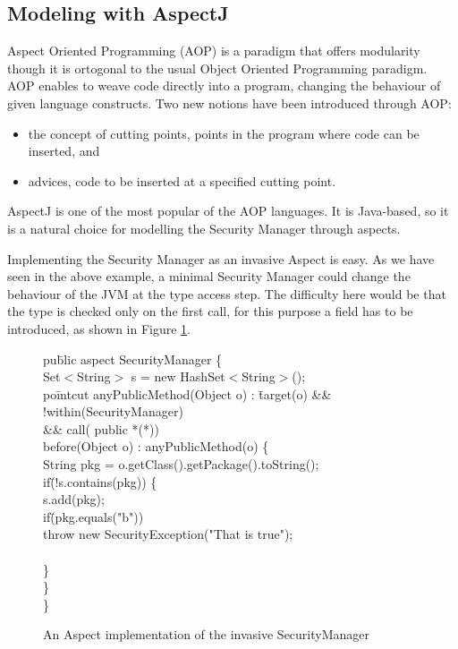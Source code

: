 \vspace{-1cm}
\subsection{Modeling with AspectJ}
Aspect Oriented Programming (AOP) is a paradigm that offers
modularity though it is ortogonal to the usual Object Oriented
Programming paradigm. AOP enables to weave code directly into a
program,  changing the behaviour of given language constructs. Two new
notions have been introduced through AOP:
\begin{itemize}
\item the concept of cutting points, points in the program where code
can be inserted, and
\item advices, code to be inserted at a specified cutting point.
\end{itemize}
AspectJ is one of the most popular of the AOP languages. It is Java-based, 
so it is a natural choice for modelling the Security Manager through aspects.

Implementing the Security Manager as an invasive Aspect is easy.  As
we have seen in the above example, a minimal Security Manager could
change the behaviour of the JVM at the type access step. The
difficulty here would be that the type is checked only on the first
call, for this purpose a field has to be introduced, as shown in
Figure \ref{base_implem}.
%
\vspace{-0.4cm}
\begin{figure}
\bcode
pu\=blic aspect SecurityManager \{\+\\

Set$<$String$>$ s = new HashSet$<$String$>$();\\
po\=intcut anyPublicMethod(Object o) : \=target(o) \&\& !within(SecurityManager)\+ \\
           \>\&\& call( public *(*))\-\\
before(Object o) : anyPublicMethod(o) \{\+\\
    String pkg = o.getClass().getPackage().toString();\\
    if\=(!s.contains(pkg)) \{\+\\     
       s.add(pkg);\\
       if\=(pkg.equals("b"))\\
           \>throw new SecurityException("That is true");\\\-\\ 
    \}\-\\
\}\-\\
\}
\ecode
\caption{An Aspect implementation of the invasive SecurityManager}
\label{base_implem}
\end{figure}
\vspace{-1cm}
